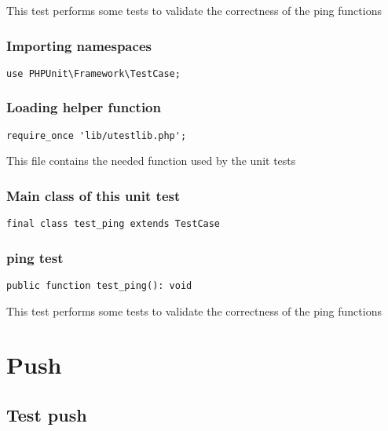 \documentclass[a4paper]{article}
\begin{document}
This test performs some tests to validate the correctness
of the ping functions

\hypertarget{toc335}{}
\subsubsection{Importing namespaces}

\begin{lstlisting}
use PHPUnit\Framework\TestCase;
\end{lstlisting}

\hypertarget{toc336}{}
\subsubsection{Loading helper function}

\begin{lstlisting}
require_once 'lib/utestlib.php';
\end{lstlisting}

This file contains the needed function used by the unit tests

\hypertarget{toc337}{}
\subsubsection{Main class of this unit test}

\begin{lstlisting}
final class test_ping extends TestCase
\end{lstlisting}

\hypertarget{toc338}{}
\subsubsection{ping test}

\begin{lstlisting}
public function test_ping(): void
\end{lstlisting}

This test performs some tests to validate the correctness
of the ping functions


\hypertarget{toc339}{}
\section{Push}

\hypertarget{toc340}{}
\subsection{Test push}
\end{document}

